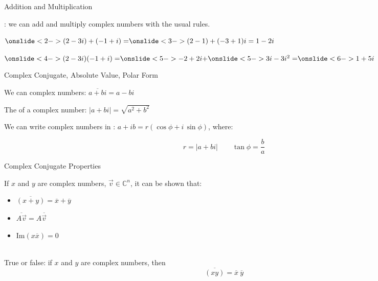 \begin{frame}{Addition and Multiplication}



    : we can add and multiply complex numbers with the usual rules.

    \medskip

    $\onslide<2->{(2-3i)+(-1+i) = } \onslide<3->{(2 - 1) + (-3 + 1)i = 1 - 2i}$

    \vspace{12pt}
    
    $\onslide<4->{(2-3i)(-1+i) =} \onslide<5->{-2+2i + }\onslide<5->{3i -3i^2 = }\onslide<6->{1 +5i} $


\end{frame}




\begin{frame}{Complex Conjugate, Absolute Value, Polar Form}

    \vspace{12pt} 

    We can  complex numbers: $\overline{a+bi} = a - bi $ 

    \vspace{12pt} 
    
    \pause 

    The  of a complex number: $|a+bi| = \sqrt{a^2 + b^2}$ 

    \vspace{12pt} 

    \pause 
    
    We can write complex numbers in : $a + ib = r(\cos \phi + i\, \sin \phi)$, where: 
    
    $$r = |a+bi | \qquad \tan \phi = \frac ba$$
    
    
\end{frame}



 \begin{frame}{Complex Conjugate Properties}

     If $x$ and $y$ are complex numbers, $\vec v \in \mathbb C^n$, it can be shown that:
     \begin{itemize}
     	\item $\overline{ \left( x+ y \right) } = \overline{ x } + \overline{ y }$
     	\item $\overline{A\vec v} = A\overline{\vec v}$
    	\item Im$\left(x\overline x\right) = 0$ 
     \end{itemize}

    \vspace{12pt}
     \\ True or false: if $x$ and $y$ are complex numbers, then $$\overline{(xy)} = \overline{x} \ \overline{y}$$


 \end{frame}


